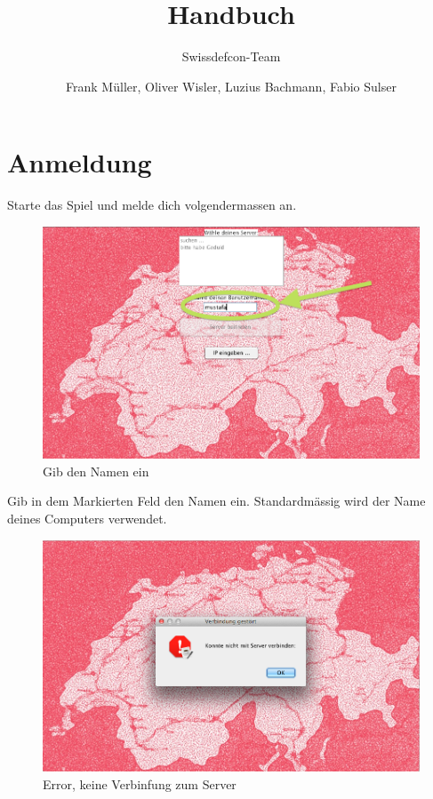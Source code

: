 \documentclass[ngerman, 12pt, pdftex]{scrartcl}[2006/07/30]
\title{Handbuch}
\author{Frank M\"{u}ller, Oliver Wisler, Luzius Bachmann, Fabio Sulser}
\subtitle{Swissdefcon-Team}
\begin{document}
\pagestyle{fancy}
\fancyhf{} 
\fancyhead[R]{\thepage}  %
\renewcommand{\headrulewidth}{0.1pt} 	%
\fancyfoot[C]{\thepage} 				%



\maketitle


\newpage

\tableofcontents

\newpage

\section{Anmeldung}

Starte das Spiel und melde dich volgendermassen an.

\begin{figure}[h]
\centering
\includegraphics[scale=0.3]{starten/namen_eingeben.png}
\caption{Gib den Namen ein}
\end{figure}

Gib in dem Markierten Feld den Namen ein. Standardm\"{a}ssig wird der Name deines Computers verwendet.

\begin{figure}[h]
\centering
\includegraphics[scale=0.3]{starten/keine_serververbindung.png}
\caption{Error, keine Verbinfung zum Server}
\end{figure}
\end{document}
